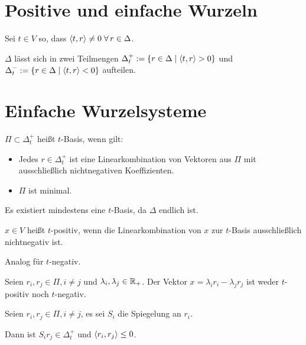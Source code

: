 \documentclass{handout}
\begin{document}
\maketitle
\section{Positive und einfache Wurzeln}
\begin{defi}
    Sei \( t \in V \) so, dass \( \scalarprod{t}{r} \neq 0 
    \; \forall r \in \Delta \).

    \( \Delta \) lässt sich in zwei Teilmengen 
    \( \Delta_t^+ := 
    \{r \in \Delta \;\vert \; \langle t, r \rangle > 0\} \) 
    und \( \Delta_t^- := 
    \{r \in \Delta \;\vert \; \langle t, r \rangle < 0\} \) 
    aufteilen. 
\end{defi}

\section{Einfache Wurzelsysteme}
\begin{defi}[\( t \)-Basis]
    \( \Pi \subset \Delta_t^+ \) heißt \( t \)-Basis, 
    wenn gilt:
    \begin{itemize}
        \item Jedes \( r \in \Delta_t^+ \) ist 
        eine Linearkombination von Vektoren aus 
        \( \Pi \) mit ausschließlich 
        nichtnegativen Koeffizienten.
        \item \( \Pi \) ist minimal.
    \end{itemize}
    Es existiert mindestens eine \( t \)-Basis, 
    da \( \Delta \) endlich ist.
\end{defi}

\begin{defi}[\( t \)-positiv]
    \( x \in V \) heißt \(t\)-positiv, wenn 
    die Linearkombination von \(x\) zur 
    \( t \)-Basis ausschließlich nichtnegativ ist.

    Analog für \( t \)-negativ.
\end{defi}

\begin{satz}
    Seien \( r_i, r_j \in \Pi, i \neq j \) und 
    \( \lambda_i, \lambda_j \in \mathbb{R}_+ \). 
    Der Vektor \( x = \lambda_i r_i - \lambda_j r_j \) 
    ist weder \( t \)-positiv noch \( t \)-negativ.
\end{satz}

\begin{satz}
    Seien \( r_i, r_j \in \Pi, i \neq j \), es 
    sei \( S_i \) die Spiegelung an \( r_i \). 

    Dann ist \( S_i r_j \in \Delta_t^+ \) und 
    \( \langle r_i, r_j \rangle \leq 0 \).
\end{satz}
\end{document}
